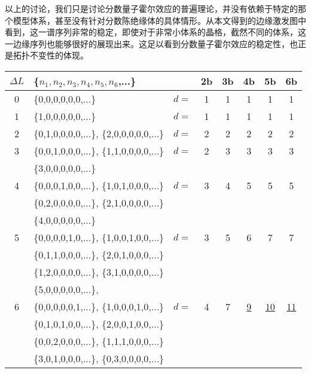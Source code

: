 以上的讨论，我们只是讨论分数量子霍尔效应的普遍理论，并没有依赖于特定的那个模型体系，甚至没有针对分数陈绝缘体的具体情形。从本文得到的边缘激发图中看到，这一谱序列非常的稳定，即使对于非常小体系的晶格，截然不同的体系，这一边缘序列也能够很好的展现出来。这足以看到分数量子霍尔效应的稳定性，也正是拓扑不变性的体现。

\begin{table}[h]
\centering
\begin{tabular}{c|l|l c c c c c}
 \hline
 \hline
$\Delta L$ & \{$n_1,n_2,n_3,n_4,n_5,n_6$,...\}        &  &2b &3b &4b &5b &6b  \\
 \hline
 \hline
     0 & \{0,0,0,0,0,0,...\}                          &$d=$  &1 &1 &1 &1  &1  \\

 \hline
     1 & \{1,0,0,0,0,0,...\}                          &$d=$  &1 &1 &1 &1  &1  \\
 \hline
     2 & \{0,1,0,0,0,0,...\},   \{2,0,0,0,0,0,...\}  &$d=$  &2 &2 &2 &2  &2  \\
 \hline
     3 & \{0,0,1,0,0,0,...\},   \{1,1,0,0,0,0,...\}  &$d=$  &2 &3 &3 &3  &3  \\
       & \{3,0,0,0,0,0,...\}                                                 \\
 \hline
     4 & \{0,0,0,1,0,0,...\},   \{1,0,1,0,0,0,...\}  &$d=$  &3 &4 &5 &5  &5  \\
       & \{0,2,0,0,0,0,...\},   \{2,1,0,0,0,0,...\}                         \\
       & \{4,0,0,0,0,0,...\}                                                 \\
 \hline
     5 & \{0,0,0,0,1,0,...\},   \{1,0,0,1,0,0,...\}  &$d=$  &3 &5 &6 &7  &7  \\
       & \{0,1,1,0,0,0,...\},   \{2,0,1,0,0,0,...\}                         \\
       & \{1,2,0,0,0,0,...\},   \{3,1,0,0,0,0,...\}                         \\
       & \{5,0,0,0,0,0,...\},                                                \\
 \hline
     6 & \{0,0,0,0,0,1,...\},   \{1,0,0,0,1,0,...\}  &$d=$  &4 &7 &\underline{9} &\underline{10} &\underline{11} \\
       & \{0,1,0,1,0,0,...\},   \{2,0,0,1,0,0,...\}                         \\
       & \{0,0,2,0,0,0,...\},   \{1,1,1,0,0,0,...\}                         \\
       & \{3,0,1,0,0,0,...\},   \{0,3,0,0,0,0,...\}                         \\

\end{tabular}
\end{table}
